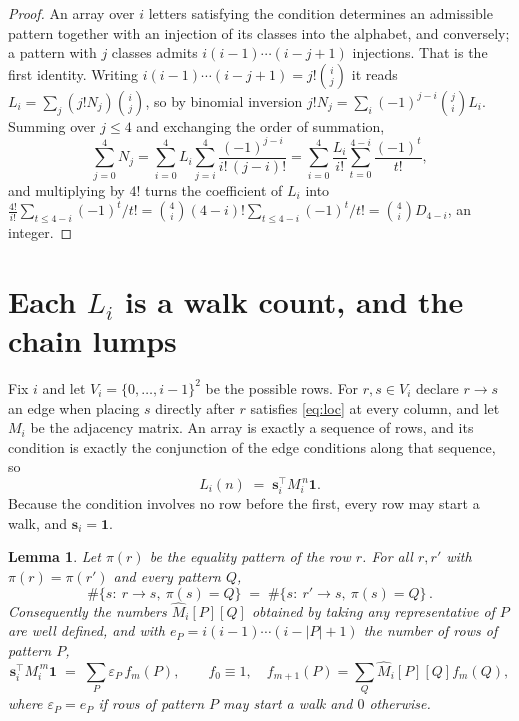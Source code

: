 \documentclass[11pt,a4paper]{article}
\theoremstyle{plain}
\newtheorem{lemma}[theorem]{Lemma}
\theoremstyle{definition}
\begin{document}
\begin{proof}
An array over $i$ letters satisfying the condition determines an admissible pattern together
with an injection of its classes into the alphabet, and conversely; a pattern with $j$
classes admits $i(i-1)\cdots(i-j+1)$ injections. That is the first identity. Writing
$i(i-1)\cdots(i-j+1)=j!\binom{i}{j}$ it reads $L_i=\sum_j (j!N_j)\binom{i}{j}$, so by
binomial inversion $j!N_j=\sum_{i}(-1)^{j-i}\binom{j}{i}L_i$. Summing over
$j\le 4$ and exchanging the order of summation,
\[
\sum_{j=0}^{4}N_j=\sum_{i=0}^{4}L_i\sum_{j=i}^{4}\frac{(-1)^{j-i}}{i!\,(j-i)!}
=\sum_{i=0}^{4}\frac{L_i}{i!}\sum_{t=0}^{4-i}\frac{(-1)^t}{t!} ,
\]
and multiplying by $4!$ turns the coefficient of $L_i$ into
$\frac{4!}{i!}\sum_{t\le 4-i}(-1)^t/t!=\binom{4}{i}(4-i)!\sum_{t\le 4-i}(-1)^t/t!
=\binom{4}{i}D_{4-i}$, an integer.
\end{proof}

\section{Each $L_i$ is a walk count, and the chain lumps}

Fix $i$ and let $V_i=\{0,\dots,i-1\}^{2}$ be the possible rows. For $r,s\in V_i$
declare $r\to s$ an edge when placing $s$ directly after $r$ satisfies \eqref{eq:loc} at
every column, and let $M_i$ be the adjacency matrix. An array is exactly a sequence of
rows, and its condition is exactly the conjunction of the edge conditions along that
sequence, so
\[
L_i(n)\;=\;\mathbf{s}_i^{\!\top}M_i^{\,n}\mathbf{1} .
\]
Because the condition involves no row before the first, every
row may start a walk, and $\mathbf{s}_i=\mathbf{1}$.

\begin{lemma}\label{lem:lump}
Let $\pi(r)$ be the equality pattern of the row $r$. For all $r,r'$ with
$\pi(r)=\pi(r')$ and every pattern $Q$,
\[
\#\{s:\ r\to s,\ \pi(s)=Q\}\;=\;\#\{s:\ r'\to s,\ \pi(s)=Q\}\, .
\]
Consequently the numbers $\widehat M_i[P][Q]$ obtained by taking any representative of $P$
are well defined, and with $e_P=i(i-1)\cdots(i-|P|+1)$ the number of rows of pattern $P$,
\[
\mathbf{s}_i^{\!\top}M_i^{\,m}\mathbf{1}\;=\;\sum_P \varepsilon_P\,f_m(P),
\qquad f_0\equiv1,\quad f_{m+1}(P)=\sum_Q\widehat M_i[P][Q]f_m(Q),
\]
where $\varepsilon_P=e_P$ if rows of pattern $P$ may start a walk and $0$ otherwise.
\end{lemma}
\end{document}
